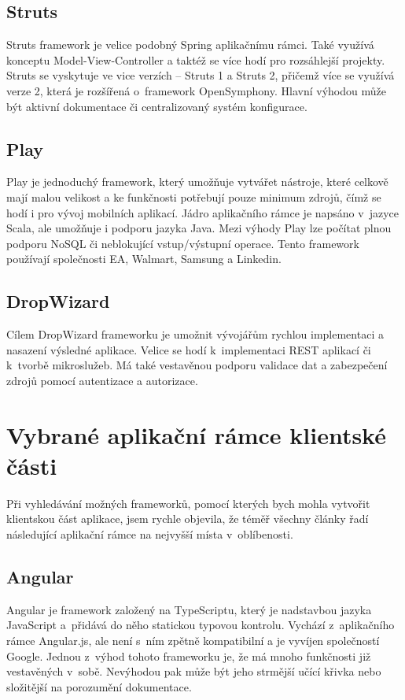 \subsection{Struts}

Struts framework je velice podobný Spring aplikačnímu rámci. Také využívá konceptu Model-View-Controller a taktéž se více hodí pro rozsáhlejší projekty. Struts se vyskytuje ve vice verzích – Struts 1 a Struts 2, přičemž více se využívá verze 2, která je rozšířená o~framework OpenSymphony. Hlavní výhodou může být aktivní dokumentace či centralizovaný systém konfigurace.

\subsection{Play}

Play je jednoduchý framework, který umožňuje vytvářet nástroje, které celkově mají malou velikost a ke funkčnosti potřebují pouze minimum zdrojů, čímž se hodí i pro vývoj mobilních aplikací. Jádro aplikačního rámce je napsáno v~jazyce Scala, ale umožňuje i podporu jazyka Java. Mezi výhody Play lze počítat plnou podporu NoSQL či neblokující vstup/výstupní operace. Tento framework používají společnosti EA, Walmart, Samsung a Linkedin.

\subsection{DropWizard}

Cílem DropWizard frameworku je umožnit vývojářům rychlou implementaci a nasazení výsledné aplikace. Velice se hodí k~implementaci REST aplikací či k~tvorbě mikroslužeb. Má také vestavěnou podporu validace dat a zabezpečení zdrojů pomocí autentizace a autorizace.

\section{Vybrané aplikační rámce klientské části}

Při vyhledávání možných frameworků, pomocí kterých bych mohla vytvořit klientskou část aplikace, jsem rychle objevila, že téměř všechny články řadí následující aplikační rámce na nejvyšší místa v~oblíbenosti.

\subsection{Angular}

Angular je framework založený na TypeScriptu, který je nadstavbou jazyka JavaScript a~přidává do něho statickou typovou kontrolu. Vychází z~aplikačního rámce Angular.js, ale není s~ním zpětně kompatibilní a je vyvíjen společností Google. Jednou z~výhod tohoto frameworku je, že má mnoho funkčnosti již vestavěných v~sobě. Nevýhodou pak může být jeho strmější učící křivka nebo složitější na porozumění dokumentace.

